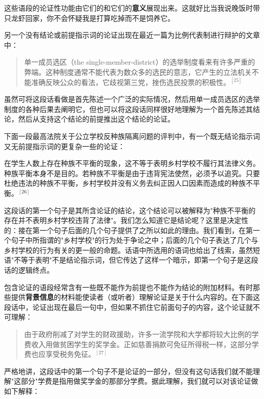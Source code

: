 这些语段的论证性功能由它们的和它们的\textbf{意义}展现出来。这就好比当我说晚饭时带只龙虾回家，你不会怀疑我是打算吃掉而不是饲养它。

另一个没有结论或前提指示词的论证出现在最近一篇为比例代表制进行辩护的文章中：

\begin{quotation}
单一成员选区（the single-member-district）的选举制度看来有许多严重的弊端。这种制度通常不能代表为数众多的选民的意志，它产生的立法机关不能准确反映公众的看法，它歧视第三党，挫伤选民投票的积极性。${}^{[25]}$
\end{quotation}

虽然可将这段话看做是首先陈述一个广泛的实际情况，然后用单一成员选区的选举制度的各种后果去阐明它，但也可以将这段话同样很好地理解为一个首先陈述其结论，然后从支持这个结论的前提推出这个结论的论证。

下面一段最高法院关于公立学校反种族隔离问题的评判中，有一个既无结论指示词又无前提指示词的更复杂一些的论证：

\begin{displayquote}
在学生人数上存在种族不平衡的现象，这不等于表明乡村学校不履行其法律义务。种族平衡本身不是目的。若种族不平衡是由于违背宪法使然，必须予以追究。只要杜绝违法的种族不平衡，乡村学校并没有义务去纠正因人口因素而造成的种族不平衡。${}^{[26]}$
\end{displayquote}

这段话的第一个句子是其所含论证的结论，这个结论可以被解释为"种族不平衡的存在并不表明乡村学校违背了法律"。我们怎么知道它是结论呢？这里是决定性的：接在第一个句子后面的几个句子提供了之所以如此的理由。我们看到，在第一个句子中所指谓的"乡村学校"的行为处于争论之中；后面的几个句子表达了几个与乡村学校的行为有关的更一般的命题。话语中所选用的语词也给出了线索，虽然短语"不等于表明"不是结论指示词，但它传达了这样一个暗示，即第一个句子是这段话的逻辑终点。

包含论证的语段经常含有一些既不能作为前提也不能作为结论的附加材料。有时那些提供\textbf{背景信息}的材料能使读者（或听者）理解论证是关于什么内容的。在下面这段话中，论证出现在最后一句中，但如果不抓住它前面句子的内容，这个论证就不可理解：

\begin{quotation}
由于政府削减了对学生的财政援助，许多一流学院和大学都将较大比例的学费收入用做贫困学生的奖学金。正如慈善捐款可免征所得税一样，这部分学费也应享受税务免征。${}^{[27]}$
\end{quotation}

严格地讲，这段话中的第一个句子不是论证的一部分，但没有这句话我们就不能理解"这部分"学费是指用做奖学金的那部分学费。据此理解，我们就可以对该论证做如下解释：

